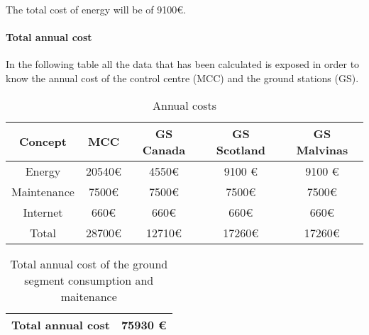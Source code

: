 The total cost of energy will be of 9100\euro. 

\paragraph{Total annual cost}
In the following table all the data that has been calculated is exposed in order to know the annual cost of the control centre (MCC) and the ground stations (GS).
\begin{table}[H]
\begin{center}
\begin{tabular}{|c|c|c|c|c|}
\hline
\textbf{Concept}&\textbf{MCC}&\textbf{GS Canada}&\textbf{GS Scotland}&\textbf{GS Malvinas}\\
\hline
Energy&20540\euro &4550\euro &9100 \euro &9100 \euro\\
\hline
Maintenance&7500\euro &7500\euro &7500\euro &7500\euro \\
\hline
Internet&660\euro &660\euro &660\euro &660\euro\\
\hline
Total&28700\euro &12710\euro &17260\euro &17260\euro \\
\hline
\end{tabular}
\caption{Annual costs}
\end{center}
\end{table}
\begin{table}[H]
\begin{center}
\begin{tabular}{|c|c|}
\hline
\textbf{Total annual cost}&\textbf{75930 \euro}\\
\hline
\end{tabular}
\caption{Total annual cost of the ground segment consumption and maitenance}
\end{center}
\end{table}